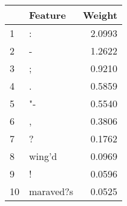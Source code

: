 \begin{tabular}{llr}
\toprule
{} &    Feature &  Weight \\
\midrule
1  &          : &  2.0993 \\
2  &          - &  1.2622 \\
3  &          ; &  0.9210 \\
4  &          . &  0.5859 \\
5  &         "- &  0.5540 \\
6  &          , &  0.3806 \\
7  &          ? &  0.1762 \\
8  &     wing'd &  0.0969 \\
9  &          ! &  0.0596 \\
10 &  maraved?s &  0.0525 \\
\bottomrule
\end{tabular}
